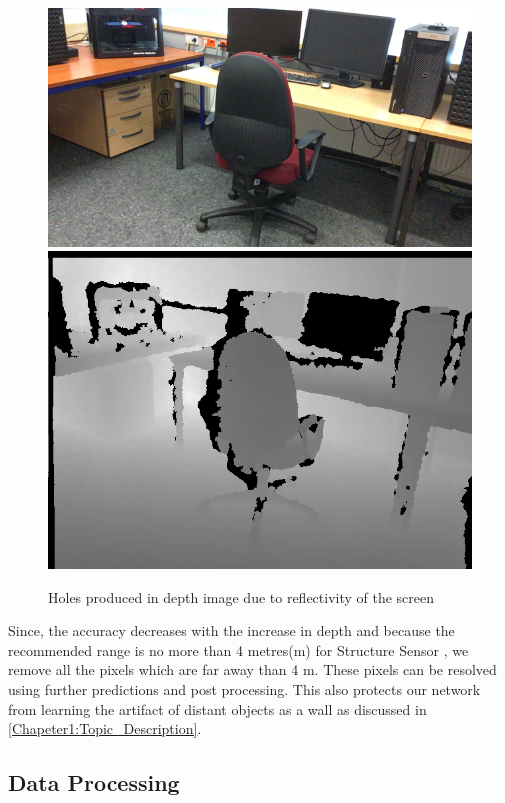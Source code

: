 \begin{figure}[h]
    \includegraphics[scale=0.29]{Figures/7.png} \includegraphics[scale=0.24]{Figures/Raw7.png}
    \caption{Holes produced in depth image due to reflectivity of the screen}
    \label{fig:screens}
\end{figure}
 

Since, the accuracy decreases with the increase in depth \cite{deptherror} and because the recommended range is no more than 4 metres(m) for Structure Sensor \cite{Kalantari}, we remove all the pixels which are far away than 4 m. These pixels can be resolved using further predictions and post processing. This also protects our network from learning the artifact of distant objects as a wall as discussed in \ref{Chapeter1:Topic_Description}.\\

\subsection{Data Processing}

